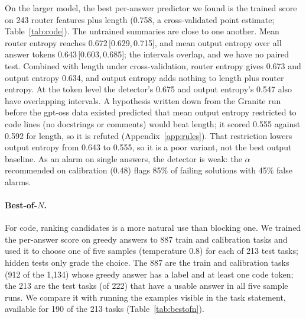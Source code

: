\documentclass[11pt]{article}
\newcommand{\ci}[2]{\,[#1,\,#2]}
\begin{document}
On the larger model, the best per-answer predictor we found is the trained score on 243 router features plus length (0.758, a cross-validated point estimate; Table~\ref{tab:code}).
The untrained summaries are close to one another.
Mean router entropy reaches 0.672\ci{0.629}{0.715}, and mean output entropy over all answer tokens 0.643\ci{0.603}{0.685}; the intervals overlap, and we have no paired test.
Combined with length under cross-validation, router entropy gives 0.673 and output entropy 0.634, and output entropy adds nothing to length plus router entropy.
At the token level the detector's 0.675 and output entropy's 0.547 also have overlapping intervals.
A hypothesis written down from the Granite run before the gpt-oss data existed predicted that mean output entropy restricted to code lines (no docstrings or comments) would beat length; it scored 0.555 against 0.592 for length, so it is refuted (Appendix~\ref{app:rules}).
That restriction lowers output entropy from 0.643 to 0.555, so it is a poor variant, not the best output baseline.
As an alarm on single answers, the detector is weak: the $\alpha$ recommended on calibration (0.48) flags 85\% of failing solutions with 45\% false alarms.

\paragraph{Best-of-$N$.}
For code, ranking candidates is a more natural use than blocking one.
We trained the per-answer score on greedy answers to 887 train and calibration tasks and used it to choose one of five samples (temperature 0.8) for each of 213 test tasks; hidden tests only grade the choice.
The 887 are the train and calibration tasks (912 of the 1,134) whose greedy answer has a label and at least one code token; the 213 are the test tasks (of 222) that have a usable answer in all five sample runs.
We compare it with running the examples visible in the task statement, available for 190 of the 213 tasks (Table~\ref{tab:bestofn}).
\end{document}
